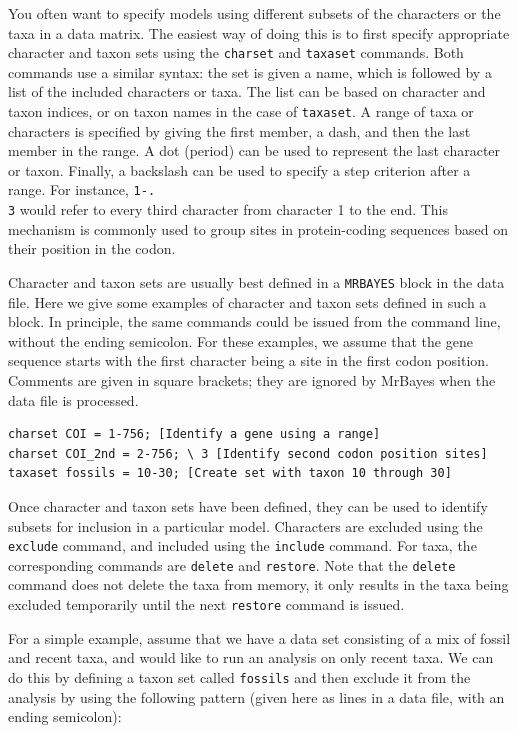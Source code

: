 \documentclass[12pt]{book}
\newcommand{\ttt}[1]{\texttt{#1}}
\begin{document}
You often want to specify models using different subsets of the characters or the taxa in a data
matrix. The easiest way of doing this is to first specify appropriate character and taxon sets
using the \ttt{charset} and \ttt{taxaset} commands. Both commands use a similar syntax: the set is
given a name, which is followed by a list of the included characters or taxa. The list can be based
on character and taxon indices, or on taxon names in the case of \ttt{taxaset}. A range of taxa or
characters is specified by giving the first member, a dash, and then the last member in the range.
A dot (period) can be used to represent the last character or taxon. Finally, a backslash can be
used to specify a step criterion after a range. For instance, \ttt{1-.\\3} would refer to every
third character from character 1 to the end. This mechanism is commonly used to group sites in
protein-coding sequences based on their position in the codon.

Character and taxon sets are usually best defined in a \ttt{MRBAYES} block in the data file. Here
we give some examples of character and taxon sets defined in such a block. In principle, the same
commands could be issued from the command line, without the ending semicolon. For these examples,
we assume that the gene sequence starts with the first character being a site in the first codon
position.  Comments are given in square brackets; they are ignored by MrBayes when the data file is
processed.

\footnotesize
\begin{singlespacing}
\begin{verbatim}
charset COI = 1-756; [Identify a gene using a range]
charset COI_2nd = 2-756; \ 3 [Identify second codon position sites]
taxaset fossils = 10-30; [Create set with taxon 10 through 30]
\end{verbatim}
\end{singlespacing}
\normalsize

Once character and taxon sets have been defined, they can be used to identify subsets for inclusion
in a particular model. Characters are excluded using the \ttt{exclude} command, and included using
the \ttt{include} command. For taxa, the corresponding commands are \ttt{delete} and \ttt{restore}.
Note that the \ttt{delete} command does not delete the taxa from memory, it only results in the
taxa being excluded temporarily until the next \ttt{restore} command is issued.

For a simple example, assume that we have a data set consisting of a mix of fossil and recent taxa,
and would like to run an analysis on only recent taxa. We can do this by defining a taxon set
called \ttt{fossils} and then exclude it from the analysis by using the following pattern (given
here as lines in a data file, with an ending semicolon):
\end{document}
